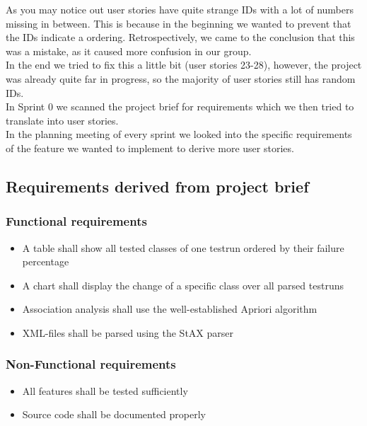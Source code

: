 As you may notice out user stories have quite strange IDs with a lot of numbers missing in between. This is because in the beginning we wanted to prevent that the IDs indicate a ordering. Retrospectively, we came to the conclusion that this was a mistake, as it caused more confusion in our group.\\
In the end we tried to fix this a little bit (user stories 23-28), however, the project was already quite far in progress, so the majority of user stories still has random IDs.  \\
\newline
In Sprint 0 we scanned the project brief for requirements which we then tried to translate into user stories.\\
In the planning meeting of every sprint we looked into the specific requirements of the feature we wanted to implement to derive more user stories.

\subsection{Requirements derived from project brief}
\subsubsection{Functional requirements}
\begin{itemize}	
	\item A table shall show all tested classes of one testrun ordered by their failure percentage
	\item A chart shall display the change of a specific class over all parsed testruns
	\item Association analysis shall use the well-established Apriori algorithm
	\item XML-files shall be parsed using the StAX parser
	
\end{itemize}

\subsubsection{Non-Functional requirements}
\begin{itemize}
	\item All features shall be tested sufficiently
	\item Source code shall be documented properly
\end{itemize}


